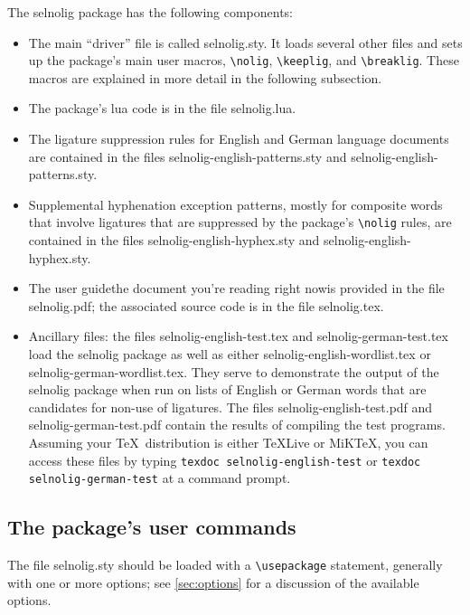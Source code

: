 \documentclass[11pt]{article}
\newcommand{\pkg}[1]{\textsf{#1}}
\newcommand{\cmmd}[1]{\texttt{\textbackslash #1}}
\begin{document}
The \pkg{selnolig} package has the following components:
\begin{itemize}
\item The main \enquote{driver} file is called \pkg{selnolig.sty}. It loads several other files and sets up the package's main user macros, \cmmd{nolig}, \cmmd{keeplig}, and \cmmd{breaklig}. These macros are explained in more detail in the following subsection.
\item The package's lua code is in the file \pkg{selnolig.lua}. 
\item The ligature suppression rules for English and German language documents are contained in the files \pkg{selnolig-english-patterns.sty} and \pkg{selnolig-english-patterns.sty}. 
\item Supplemental hyphenation exception patterns, mostly for composite words that involve ligatures that are  suppressed by the package's \cmmd{nolig} rules, are contained in the files \pkg{selnolig-english-hyphex.sty} and \pkg{selnolig-english-hyphex.sty}.
\item The user guide\textemdash the document you're reading right now\textemdash is provided in the file \pkg{selnolig.pdf}; the associated source code is in the file \pkg{selnolig.tex}. 
\item Ancillary files: the files \pkg{selnolig-english-test.tex} and \pkg{selnolig-german-test.tex} load the \pkg{selnolig} package as well as either \pkg{selnolig-english-wordlist.tex} or \pkg{selnolig-german-wordlist.tex}. They serve to demonstrate the output of the \pkg{selnolig} package when run on lists of English or German words that are candidates for non-use of ligatures. The files \pkg{selnolig-english-test.pdf} and \pkg{selnolig-german-test.pdf} contain the results of compiling the test programs. 
Assuming your \TeX\ distribution is either \TeX Live or MiK\TeX, you can access these files by typing \Verb+texdoc selnolig-english-test+ or \Verb+texdoc selnolig-german-test+ at a command prompt. 

\end{itemize}


\subsection{The package's user commands} \label{sec:syntax}

The file \pkg{selnolig.sty} should be loaded with a \cmmd{usepackage} statement, generally with one or more options; see \cref{sec:options} for a discussion of the available options. 
\end{document}
